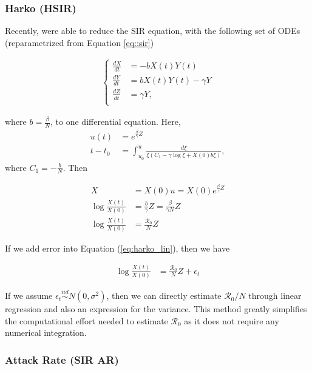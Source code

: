 \documentclass[12pt]{article}
\newcommand{\rr}{\ensuremath{\mathcal{R}_0}}
\begin{document}
\subsubsection{Harko (HSIR)}
Recently, \citep{harko2014exact} were able to reduce the SIR equation, with the following set of ODEs (reparametrized from Equation \eqref{eq::sir})

\begin{align*}
  \left \{ \begin{array}{ll}
             \frac{dX}{dt} &= - b X(t) Y(t) \\
             \frac{dY}{dt} &=  b X(t) Y(t) - \gamma Y\\
             \frac{dZ}{dt} &= \gamma Y,\\
           \end{array}
  \right .
\end{align*}

where $b = \frac{\beta}{N}$, to one differential equation.  Here,
\begin{align*}
  u(t) &= e^{\frac{\beta}{\gamma}Z} \\
  t - t_0 &= \int_{u_0}^u \frac{d \xi}{\xi (C_1 - \gamma \log \xi + X(0) b \xi)},
\end{align*}
where $C_1 = -\frac{b}{N}$.  Then

\begin{align}
  X &= X(0) u  = X(0) e^{\frac{\beta}{\gamma}Z} \nonumber\\
  \log \frac{X(t)}{X(0)} &=  \frac{b}{\gamma}Z =  \frac{\beta}{\gamma N} Z \nonumber\\
  \log \frac{X(t)}{X(0)} &=  \frac{\rr}{N} Z \label{eq:harko_lin}
\end{align}

If we add error into Equation (\ref{eq:harko_lin}), then we have

\begin{align}
  \log \frac{X(t)}{X(0)} &=  \frac{\rr}{N} Z  + \epsilon_t\label{eq:r0_harko}
\end{align}

If we assume $\epsilon_t \overset{iid}{\sim}N(0, \sigma^2)$, then we can directly estimate $\rr/N$ through linear regression and also an expression for the variance.  This method greatly simplifies the computational effort needed to estimate $\rr$ as it does not require any numerical integration.

\subsubsection{Attack Rate (SIR AR)}
\end{document}
